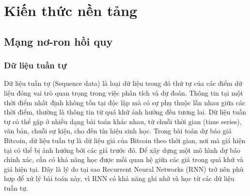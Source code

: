 





\chapter{Kiến thức nền tảng}
\section{Mạng nơ-ron hồi quy}
\subsection{Dữ liệu tuần tự}
Dữ liệu tuần tự (Sequence data) là loại dữ liệu trong đó thứ tự của các điểm dữ liệu đóng vai trò quan trọng trong việc phân tích và dự đoán. Thông tin tại một thời điểm nhất định không tồn tại độc lập mà có sự phụ thuộc lẫn nhau giữa các thời điểm, thường là thông tin từ quá khứ ảnh hưởng đến tương lai. Dữ liệu tuần tự có thể gặp ở nhiều dạng bài toán khác nhau, từ chuỗi thời gian (time series), văn bản, chuỗi sự kiện, cho đến tín hiệu sinh học. Trong bài toán dự báo giá Bitcoin, dữ liệu tuần tự là dữ liệu giá của Bitcoin theo thời gian, nơi mà giá hiện tại có thể bị ảnh hưởng bởi các giá trước đó. Để xây dựng một mô hình dự báo chính xác, cần có khả năng học được mối quan hệ giữa các giá trong quá khứ và giá hiện tại. Đây là lý do tại sao Recurrent Neural Networks (RNN) trở nên phù hợp để xử lý bài toán này, vì RNN có khả năng ghi nhớ và học từ các dữ liệu tuần tự.
